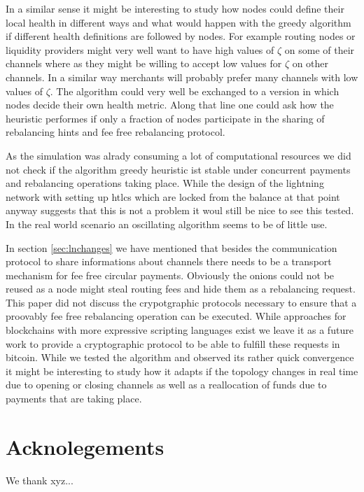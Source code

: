 \documentclass[a4paper]{paper}
\begin{document}
In a similar sense it might be interesting to study how nodes could define their local health in different ways and what would happen with the greedy algorithm if different health definitions are followed by nodes.
For example routing nodes or liquidity providers might very well want to have high values of $\zeta$ on some of their channels where as they might be willing to accept low values for $\zeta$ on other channels.
In a similar way merchants will probably prefer many channels with low values of $\zeta$.
The algorithm could very well be exchanged to a version in which nodes decide their own health metric.
Along that line one could ask how the heuristic performes if only a fraction of nodes participate in the sharing of rebalancing hints and fee free rebalancing protocol.

As the simulation was alrady consuming a lot of computational resources we did not check if the algorithm greedy heuristic ist stable under concurrent payments and rebalancing operations taking place.
While the design of the lightning network with setting up htlcs which are locked from the balance at that point anyway suggests that this is not a problem it woul still be nice to see this tested.
In the real world scenario an oscillating algorithm seems to be of little use. 

In section \ref{sec:lnchanges} we have mentioned that besides the communication protocol to share informations about channels there needs to be a transport mechanism for fee free circular payments.
Obviously the onions could not be reused as a node might steal routing fees and hide them as a rebalancing request.
This paper did not discuss the crypotgraphic protocols necessary to ensure that a proovably fee free rebalancing operation can be executed.
While approaches for blockchains with more expressive scripting languages exist \cite{khalil2017revive} we leave it as a future work to provide a cryptographic protocol to be able to fulfill these requests in bitcoin.
While we tested the algorithm and observed its rather quick convergence it might be interesting to study how it adapts if the topology changes in real time due to opening or closing channels as well as a reallocation of funds due to payments that are taking place.

\section{Acknolegements}\label{sec:ack}
We thank xyz...




\end{document}
